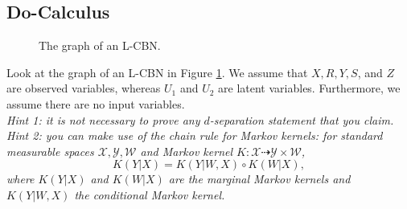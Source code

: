 \subsection{Do-Calculus}

\begin{figure}[ht]
  \centering
  \caption{The graph of an L-CBN.}\label{fig:my_fig}
  \end{figure}

Look at the graph of an L-CBN in Figure \ref{fig:my_fig}.
We assume that $X, R, Y, S$, and $Z$ are observed variables, whereas $U_1$ and $U_2$ are latent variables.
Furthermore, we assume there are no input variables.\\
\emph{Hint 1: it is not necessary to prove any $d$-separation statement that you claim.}\\
\emph{Hint 2: you can make use of the chain rule for Markov kernels: for standard measurable spaces
$\mathcal{X},\mathcal{Y},\mathcal{W}$ and Markov kernel $K: \mathcal{X} \dashrightarrow \mathcal{Y} \times \mathcal{W}$,
\begin{equation*}
  K(Y | X) = K(Y | W, X) \circ K(W | X),
\end{equation*}
where $K(Y | X)$ and $K(W | X)$ are the marginal Markov kernels and $K(Y | W, X)$ the conditional Markov kernel.}

